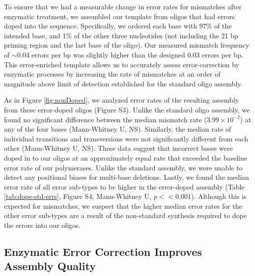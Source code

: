\documentclass[letterpaper,12pt]{article}
\begin{document}
To ensure that we had a measurable change in error rates for mismatches after enzymatic treatment, we assembled our template from oligos that had errors doped into the sequence. Specifically, we ordered each base with 97\% of the intended base, and 1\% of the other three nucleotides (not including the 21 bp priming region and the last base of the oligo). Our measured mismatch frequency of $\sim$0.04 errors per bp was slightly higher than the designed 0.03 errors per bp. This error-enriched template allows us to accurately assess error-correction by enzymatic processes by increasing the rate of mismatches at an order of magnitude above limit of detection established for the standard oligo assembly.

As in Figure \ref{fig:nonDoped}, we analyzed error rates of the resulting assembly from these error-doped oligos (Figure S3). Unlike the standard oligo assembly, we found no significant difference between the median mismatch rate ($3.99\times10^{-2}$) at any of the four bases (Mann-Whitney U, NS). Similarly, the median rate of individual transitions and transversions were not significantly different from each other (Mann-Whitney U, NS). These data suggest that incorrect bases were doped in to our oligos at an approximately equal rate that exceeded the baseline error rate of our polymerases. Unlike the standard assembly, we were unable to detect any positional biases for multi-base deletions. Lastly, we found the median error rate of all error sub-types to be higher in the error-doped assembly (Table \ref{tab:dope-std-errs}, Figure S4; Mann-Whitney U, $p << 0.001$). Although this is expected for mismatches, we suspect that the higher median error rates for the other error sub-types are a result of the non-standard synthesis required to dope the errors into our oligos.


\subsection*{Enzymatic Error Correction Improves Assembly Quality}
\end{document}
